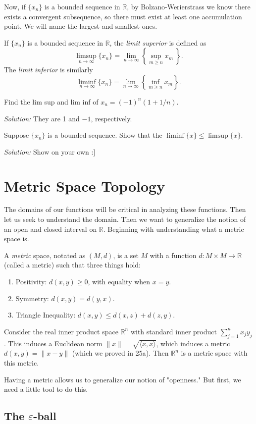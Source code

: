 \documentclass[11pt]{article}
\theoremstyle{definition}
\newcommand{\R}{\mathbb{R}}                      %
\begin{document}
Now, if $\{x_n\}$ is a bounded sequence in $\R$, by Bolzano-Werierstrass we know there exists a convergent subsequence, so there must exist at least one accumulation point. We will name the largest and smallest ones.

 If $\{x_n\}$ is a bounded sequence in $\R$, the \textit{limit superior} is defined as 
$$
\limsup_{n\to\infty} \{x_n\}=\lim_{n\to\infty}\left\{\sup_{m\geq n} x_m\ \right\}.
$$
The \textit{limit inferior} is similarly
$$
\liminf_{n\to\infty} \{x_n\}=\lim_{n\to\infty}\left\{\inf_{m\geq n} x_m\right\}.
$$


\ex Find the lim sup and lim inf of $x_n=(-1)^n(1+1/n)$.

\textit{Solution:} They are 1 and $-1$, respectively.

\ex Suppose $\{x_n\}$ is a bounded sequence. Show that the $\liminf\{x\} \leq \limsup\{x\}$.

\textit{Solution:} Show on your own :]

\section{Metric Space Topology}

The domains of our functions will be critical in analyzing these functions. Then let us seek to understand the domain. Then we want to generalize the notion of an open and closed interval on $\R$. Beginning with understanding what a metric space is.

 A \textit{metric} space, notated as $(M,d)$, is a set $M$ with a function $d:M\times M\to \R$ (called a metric) such that three things hold:
\begin{enumerate}
    \item Positivity: $d(x,y)\geq 0$, with equality when $x=y$.
    \item Symmetry: $d(x,y)=d(y,x)$.
    \item Triangle Inequality: $d(x,y)\leq d(x,z)+d(z,y)$.
\end{enumerate}

\ex Consider the real inner product space $\R^n$ with standard inner product $\sum_{j=1}^n x_jy_j$. This induces a Euclidean norm $\|x\|=\sqrt{\langle x,x\rangle}$, which induces a metric $d(x,y)=\|x-y\|$ (which we proved in 25a). Then $\R^n$ is a metric space with this metric.

Having a metric allows us to generalize our notion of "openness." But first, we need a little tool to do this.

\subsection{The $\varepsilon$-ball}
\end{document}
